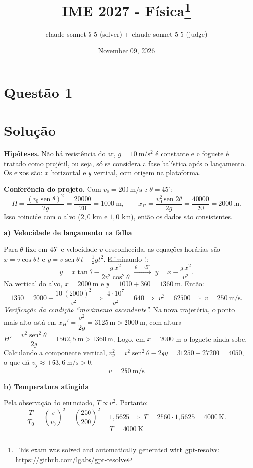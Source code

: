\documentclass{article}%
\title{IME 2027 - Física\thanks{This exam was solved and automatically generated with gpt-resolve: \url{https://github.com/lgabs/gpt-resolve}}}%
\author{claude{-}sonnet{-}5{-}5 (solver) + claude{-}sonnet{-}5{-}5 (judge)}%
\date{November 09, 2026}%
\begin{document}
%
\normalsize%
\maketitle%
\section*{Questão 1}

\section*{Solução}

\textbf{Hipóteses.} Não há resistência do ar, $g=10\ \mathrm{m/s^2}$ é constante e o foguete é tratado como projétil, ou seja, só se considera a fase balística após o lançamento. Os eixos são: $x$ horizontal e $y$ vertical, com origem na plataforma.

\textbf{Conferência do projeto.} Com $v_0=200\ \mathrm{m/s}$ e $\theta=45^\circ$:
\[
H=\frac{(v_0\operatorname{sen}\theta)^2}{2g}=\frac{20000}{20}=1000\ \mathrm{m},\qquad x_H=\frac{v_0^2\operatorname{sen}2\theta}{2g}=\frac{40000}{20}=2000\ \mathrm{m}.
\]
Isso coincide com o alvo ($2{,}0$ km e $1{,}0$ km), então os dados são consistentes.

\textbf{a) Velocidade de lançamento na falha}

Para $\theta$ fixo em $45^\circ$ e velocidade $v$ desconhecida, as equações horárias são $x=v\cos\theta\,t$ e $y=v\operatorname{sen}\theta\,t-\tfrac{1}{2}gt^2$. Eliminando $t$:
\[
y=x\tan\theta-\frac{g\,x^2}{2v^2\cos^2\theta}\;\xrightarrow{\ \theta=45^\circ\ }\;y=x-\frac{g\,x^2}{v^2}.
\]
Na vertical do alvo, $x=2000\ \mathrm{m}$ e $y=1000+360=1360\ \mathrm{m}$. Então:
\[
1360=2000-\frac{10\,(2000)^2}{v^2}\;\Rightarrow\;\frac{4\cdot10^{7}}{v^2}=640\;\Rightarrow\;v^2=62500\;\Rightarrow\; v=250\ \mathrm{m/s}.
\]
\emph{Verificação da condição ``movimento ascendente''.} Na nova trajetória, o ponto mais alto está em $x_{H}'=\dfrac{v^2}{2g}=3125\ \mathrm{m}>2000\ \mathrm{m}$, com altura $H'=\dfrac{v^2\operatorname{sen}^2\theta}{2g}=1562{,}5\ \mathrm{m}>1360\ \mathrm{m}$. Logo, em $x=2000$ m o foguete ainda sobe. Calculando a componente vertical, $v_y^2=v^2\operatorname{sen}^2\theta-2gy=31250-27200=4050$, o que dá $v_y\approx+63{,}6\ \mathrm{m/s}>0$.
\[
\boxed{v=250\ \mathrm{m/s}}
\]

\textbf{b) Temperatura atingida}

Pela observação do enunciado, $T\propto v^2$. Portanto:
\[
\frac{T}{T_0}=\left(\frac{v}{v_0}\right)^2=\left(\frac{250}{200}\right)^2=1{,}5625\;\Rightarrow\;T=2560\cdot1{,}5625=4000\ \mathrm{K}.
\]
\[
\boxed{T=4000\ \mathrm{K}}
\]
\end{document}
